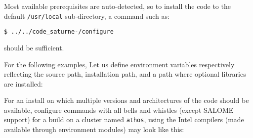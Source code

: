 \documentclass[a4paper,10pt,twoside]{csshortdoc}
\begin{document}
Most available prerequisites are auto-detected, so to install the
code to the default \texttt{/usr/local} sub-directory,
a command such as:

\texttt{\$ ../../code\_saturne-\verscs/configure}

should be sufficient.

For the following examples, Let us define environment variables respectively
reflecting the \CS source path, installation path, and a path where optional
libraries are installed:


For an install on which multiple
versions and architectures of the code should be available,
configure commands with all bells and whistles (except SALOME support) for a
build on a cluster named \texttt{athos}, using the Intel compilers
(made available through environment modules) may look like this:
\end{document}
